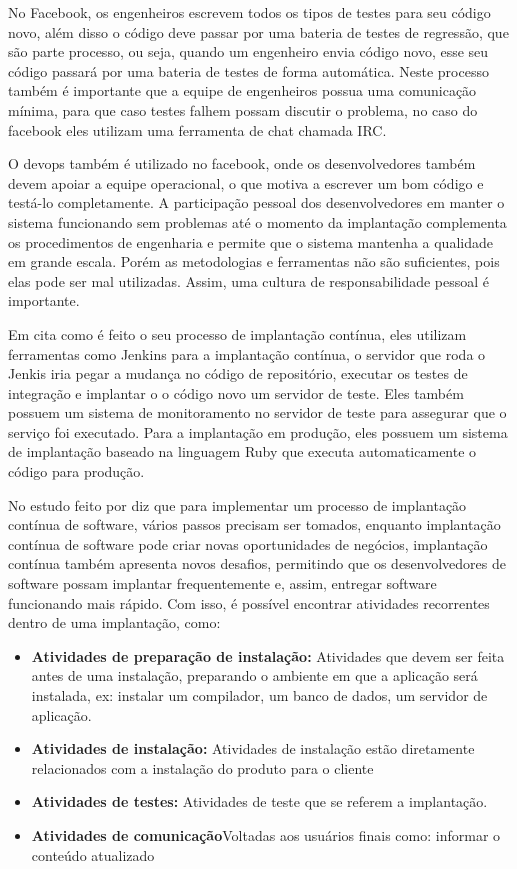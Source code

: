 \documentclass[12pt]{article}
\begin{document}
No Facebook, os engenheiros escrevem todos os tipos de testes para seu código novo, além disso o código deve passar por uma bateria de  testes de regressão, que são parte processo, ou seja, quando um engenheiro envia código novo, esse seu código passará por uma bateria de testes de forma automática. Neste processo também é importante que a equipe de engenheiros possua uma comunicação mínima, para que caso testes falhem possam discutir o problema, no caso do facebook eles utilizam uma ferramenta de chat chamada IRC.

O devops também é utilizado no facebook, onde os desenvolvedores também devem apoiar a equipe operacional, o que motiva a escrever um bom código e testá-lo completamente. A participação pessoal dos desenvolvedores em manter o sistema funcionando sem problemas até o momento da implantação complementa os procedimentos de engenharia e permite que o sistema mantenha a qualidade em grande escala. Porém as metodologias e ferramentas não são suficientes, pois elas pode ser mal utilizadas. Assim, uma cultura de responsabilidade pessoal é importante.

Em \cite{6612887} cita como é feito o seu processo de implantação contínua, eles utilizam ferramentas como Jenkins para a implantação contínua, o servidor que roda o Jenkis iria pegar a mudança no código de repositório, executar os testes de integração e implantar o o código novo um servidor de teste. Eles também possuem  um sistema de monitoramento no servidor de teste para assegurar que o serviço foi executado. Para a implantação em produção, eles possuem um sistema de  implantação baseado na linguagem Ruby que executa automaticamente o código para produção.

No estudo feito por \cite{Claps201521} diz que para implementar um processo de implantação contínua de software, vários passos precisam ser tomados, enquanto implantação contínua de software pode criar novas oportunidades de negócios, implantação contínua também apresenta novos desafios, permitindo que os desenvolvedores de software possam implantar frequentemente e, assim, entregar software funcionando mais rápido. Com isso, é possível encontrar atividades recorrentes dentro de uma implantação, como:

\begin{itemize}
  	\item \textbf{Atividades de preparação de instalação:} Atividades que devem ser feita antes de uma
instalação, preparando o ambiente em que a aplicação será instalada, ex: instalar um compilador, um banco de dados, um servidor de aplicação.
	\item \textbf{Atividades de instalação:} Atividades de instalação estão diretamente relacionados com a instalação do
produto para o cliente
   	\item \textbf{Atividades de testes:} Atividades de teste que se referem a implantação.
    \item \textbf{Atividades de comunicação}Voltadas aos usuários finais como: informar o conteúdo atualizado 
\end{itemize}
\end{document}
